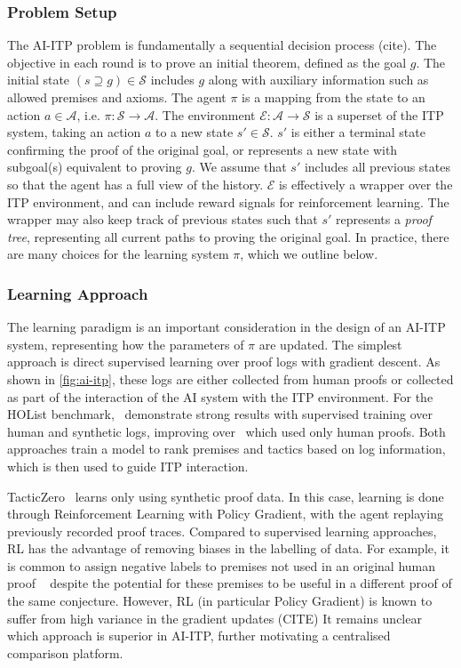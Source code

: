 \documentclass[letterpaper]{article} %
\begin{document}
    \subsubsection{Problem Setup}
    The AI-ITP problem is fundamentally a sequential decision process (cite).
    The objective in each round is to prove an initial theorem, defined as the goal $g$.
    The initial state $(s \supseteq g) \in \mathcal{S}$ includes $g$ along with auxiliary information such as allowed premises and axioms.
    The agent $\pi$ is a mapping from the state to an action $a \in \mathcal{A}$, i.e. $\pi: \mathcal{S} \to \mathcal{A}$.
    The environment $\mathcal{E}: \mathcal{A} \to \mathcal{S}$ is a superset of the ITP system,
    taking an action $a$ to a new state $s' \in \mathcal{S}$.
    $s'$ is either a terminal state confirming the proof of the original goal,
    or represents a new state with subgoal(s) equivalent to proving $g$.
    We assume that $s'$ includes all previous states so that the agent has a full view of the history.
    $\mathcal{E}$ is effectively a wrapper over the ITP environment, and can include reward signals for reinforcement learning.
    The wrapper may also keep track of previous states such that $s'$ represents a \textit{proof tree},
    representing all current paths to proving the original goal.
    In practice, there are many choices for the learning system $\pi$, which we outline below.

    \subsubsection{Learning Approach}
    The learning paradigm is an important consideration in the design of an AI-ITP system, representing how the
    parameters of $\pi$ are updated.
    The simplest approach is direct supervised learning over proof logs with gradient descent.
    As shown in \ref{fig:ai-itp},
    these logs are either collected from human proofs or collected as part of the interaction of the AI system with the ITP environment.
    For the HOList benchmark,~\cite{bansal_learning_2019} demonstrate strong results with supervised training over human and synthetic logs,
    improving over~\cite{paliwal_graph_2019} which used only human proofs.
    Both approaches train a model to rank premises and tactics based on log information,
    which is then used to guide ITP interaction.

    TacticZero~\cite{wu_tacticzero_2021} learns only using synthetic proof data.
    In this case, learning is done through Reinforcement Learning with Policy Gradient,
    with the agent replaying previously recorded proof traces.
    Compared to supervised learning approaches, RL has the advantage of removing biases in the labelling of data.
    For example, it is common to assign negative labels to premises not used in an original human proof
    ~\cite{kaliszyk_holstep_2017, kaliszyk_mizar_2015, bansal_holist_2019}
    despite the potential for these premises to be useful in a different proof of the same conjecture.
    However, RL (in particular Policy Gradient) is known to suffer from high variance in the gradient updates (CITE)
    It remains unclear which approach is superior in AI-ITP, further motivating a centralised comparison platform.
\end{document}

